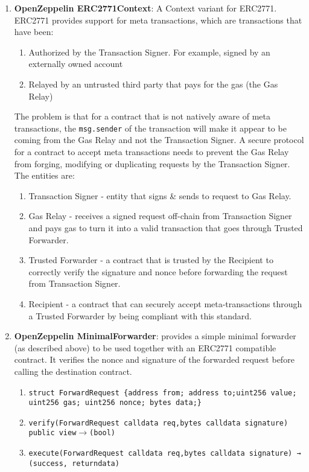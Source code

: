 \begin{enumerate}
\item\textbf{OpenZeppelin ERC2771Context}: A Context variant for ERC2771. ERC2771 provides support for meta transactions, which are transactions that have been:
	\begin{enumerate}
	\item Authorized by the Transaction Signer. For example, signed by an externally owned account
	\item Relayed by an untrusted third party that pays for the gas (the Gas Relay)
	\end{enumerate}

The problem is that for a contract that is not natively aware of meta transactions, the \verb|msg.sender| of the transaction will make it appear to be coming from the Gas Relay and not the Transaction Signer. A secure protocol for a contract to accept meta transactions needs to prevent the Gas Relay from forging, modifying or duplicating requests by the Transaction Signer. The entities are:
    \begin{enumerate}
    \item Transaction Signer - entity that signs \& sends to request to Gas Relay.
    \item Gas Relay - receives a signed request off-chain from Transaction Signer and pays gas to turn it into a valid transaction that goes through Trusted Forwarder.
    \item Trusted Forwarder - a contract that is trusted by the Recipient to correctly verify the signature and nonce before forwarding the request from Transaction Signer.
    \item Recipient - a contract that can securely accept meta-transactions through a Trusted Forwarder by being compliant with this standard.
    \end{enumerate}

\item\textbf{OpenZeppelin MinimalForwarder}: provides a simple minimal forwarder (as described above) to be used together with an ERC2771 compatible contract. It verifies the nonce and signature of the forwarded request before calling the destination contract.
	\begin{enumerate}
	\item\verb|struct ForwardRequest {address from; address to;|\linebreak\verb|uint256 value; uint256 gas; uint256 nonce; bytes data;}|
	\item\verb|verify(ForwardRequest calldata req,|\linebreak\verb|bytes calldata signature) public view|$\rightarrow$\verb|(bool)|
	\item\verb|execute(ForwardRequest calldata req,|\linebreak\verb|bytes calldata signature) → (success, returndata)|
	\end{enumerate}


\end{enumerate}
